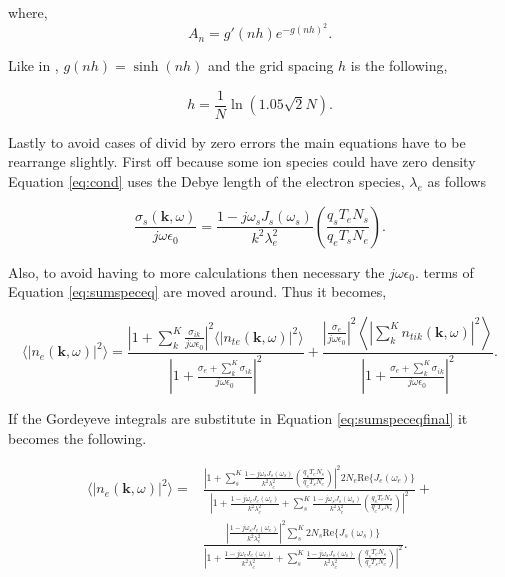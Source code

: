 \noindent where,
\begin{equation}
\label{eq:anterm}
A_n = g'(nh)e^{-g(nh)^2}.
\end{equation}

\noindent Like in \citep{Ooi:2007jx}, $g(nh) = \sinh (nh)$ and the grid spacing $h$ is the following,

\begin{equation}
\label{eq:hterm}
h = \frac{1}{N}\ln(1.05\sqrt{2}N).
\end{equation} 


Lastly to avoid cases of divid by zero errors the main equations have to be rearrange slightly. First off because some ion species could have zero density Equation \ref{eq:cond} uses the Debye length of the electron species, $\lambda_e$ as follows

\begin{equation}
\label{eq:condnew}
\frac{\sigma_{s}(\mathbf{k},\omega)}{j\omega\epsilon_0} = \frac{1-j\omega_s J_s(\omega_s)}{k^2\lambda_e^2} \left(\frac{q_sT_eN_s}{q_eT_sN_e}\right).
\end{equation}

Also, to avoid having to more calculations then necessary the $j\omega\epsilon_0$. terms of Equation \ref{eq:sumspeceq} are moved around. Thus it becomes,

\begin{equation}
\label{eq:sumspeceqfinal}
\displaystyle \langle \left|n_e(\mathbf{k},\omega)\right|^2\rangle =  \frac{\left|1 +  \sum_k^K\frac{\sigma_{ik}}{j\omega\epsilon_0} \right|^2 \langle |n_{te}(\mathbf{k},\omega)|^2\rangle}{\left|1 +\frac{\sigma_e+ \sum_k^K\sigma_{ik}}{j\omega\epsilon_0} \right|^2} + \frac{\left| \frac{\sigma_e}{j\omega\epsilon_0} \right|^2\left \langle \left|\sum_k^Kn_{tik}(\mathbf{k},\omega)\right|^2\right\rangle}{\left|1 +\frac{\sigma_e+ \sum_k^K\sigma_{ik}}{j\omega\epsilon_0} \right|^2}.
\end{equation}

\noindent If the Gordeyeve integrals are substitute in Equation \ref{eq:sumspeceqfinal} it becomes the following.

\begin{equation}
\label{eq:sumspeceqactual}
\begin{split}
\displaystyle \langle \left|n_e(\mathbf{k},\omega)\right|^2\rangle =&  \frac{\left|1 + \sum_s^K  \frac{1-j\omega_s J_s(\omega_s)}{k^2\lambda_e^2} \left(\frac{q_sT_eN_s}{q_eT_sN_e}\right) \right|^2 2N_e\text{Re}\{J_e(\omega_e)\}}{\left|1 + \frac{1-j\omega_e J_e(\omega_e)}{k^2\lambda_e^2}  +\sum_s^K  \frac{1-j\omega_s J_s(\omega_s)}{k^2\lambda_e^2} \left(\frac{q_sT_eN_s}{q_eT_sN_e}\right) \right|^2}       + \\        & \frac{\left| \frac{1-j\omega_s J_e(\omega_e)}{k^2\lambda_e^2} \right|^2\sum_s^K  2N_s\text{Re}\{J_s(\omega_s)\}}{\left|1 + \frac{1-j\omega_e J_e(\omega_e)}{k^2\lambda_e^2}  +\sum_s^K  \frac{1-j\omega_s J_s(\omega_s)}{k^2\lambda_e^2} \left(\frac{q_sT_eN_s}{q_eT_sN_e}\right) \right|^2}.
\end{split}
\end{equation}

